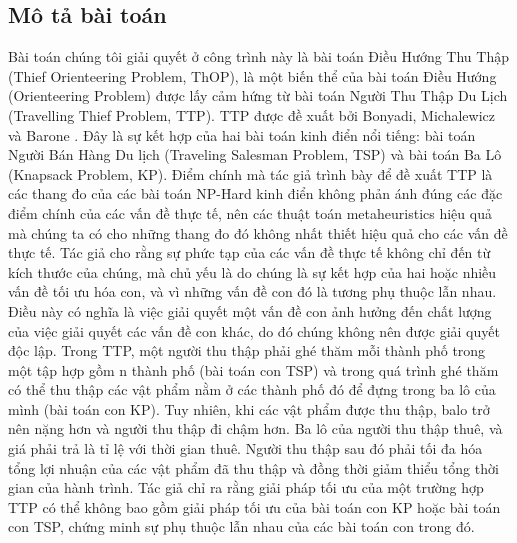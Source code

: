 \subsection{Mô tả bài toán}
Bài toán chúng tôi giải quyết ở công trình này là bài toán Điều Hướng Thu Thập (Thief Orienteering Problem, ThOP), là một biến thể của bài toán Điều Hướng (Orienteering Problem) được lấy cảm hứng từ bài toán Người Thu Thập Du Lịch (Travelling Thief Problem, TTP). TTP được đề xuất  bởi Bonyadi, Michalewicz và Barone \cite{6557681}. Đây là sự kết hợp của hai bài toán kinh điển nổi tiếng: bài toán Người Bán Hàng Du lịch (Traveling Salesman Problem, TSP) và bài toán Ba Lô (Knapsack Problem, KP). Điểm chính mà tác giả trình bày để đề xuất TTP là các thang đo của các bài toán NP-Hard kinh điển không phản ánh đúng các đặc điểm chính của các vấn đề thực tế, nên các thuật toán metaheuristics hiệu quả mà chúng ta có cho những thang đo đó không nhất thiết hiệu quả cho các vấn đề thực tế. Tác giả cho rằng sự phức tạp của các vấn đề thực tế không chỉ đến từ kích thước của chúng, mà chủ yếu là do chúng là sự kết hợp của hai hoặc nhiều vấn đề tối ưu hóa con, và vì những vấn đề con đó là tương phụ thuộc lẫn nhau. Điều này có nghĩa là việc giải quyết một vấn đề con ảnh hưởng đến chất lượng của việc giải quyết các vấn đề con khác, do đó chúng không nên được giải quyết độc lập. Trong TTP, một người thu thập phải ghé thăm mỗi thành phố trong một tập hợp gồm n thành phố (bài toán con TSP) và trong quá trình ghé thăm có thể thu thập các vật phẩm nằm ở các thành phố đó để đựng trong ba lô của mình (bài toán con KP). Tuy nhiên, khi các vật phẩm được thu thập, balo trở nên nặng hơn và người thu thập đi chậm hơn. Ba lô của người thu thập thuê, và giá phải trả là tỉ lệ với thời gian thuê. Người thu thập sau đó phải tối đa hóa tổng lợi nhuận của các vật phẩm đã thu thập và đồng thời giảm thiểu tổng thời gian của hành trình. Tác giả chỉ ra rằng giải pháp tối ưu của một trường hợp TTP có thể không bao gồm giải pháp tối ưu của bài toán con KP hoặc bài toán con TSP, chứng minh sự phụ thuộc lẫn nhau của các bài toán con trong đó.

